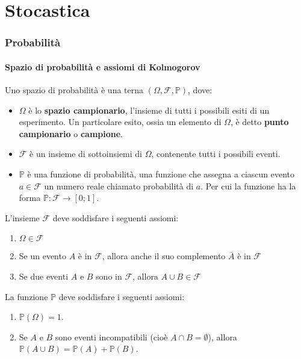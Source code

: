 \documentclass{article}
\begin{document}
\newpage
\part{Stocastica}

\section{Probabilità}

\subsection{Spazio di probabilità e assiomi di Kolmogorov}
Uno spazio di probabilità è una terna \((\Omega, \mathcal{F}, \mathbb{P})\), dove:
\begin{itemize}
    \item \(\Omega\) è lo \textbf{spazio campionario}, l'insieme di tutti i possibili esiti di
        un esperimento. Un particolare esito, ossia un elemento di \(\Omega\), è detto
        \textbf{punto campionario} o \textbf{campione}.
    \item \(\mathcal{F}\) è un insieme di sottoinsiemi di \(\Omega\), contenente tutti i
        possibili eventi.

    \item \(\mathbb{P}\) è una funzione di probabilità, una funzione che assegna a ciascun
        evento \(a \in \mathcal{F}\) un numero reale chiamato probabilità di \(a\). Per cui la
        funzione ha la forma \(\mathbb{P} \colon \mathcal{F} \to [0;1]\).
\end{itemize}
L'insieme \(\mathcal{F}\) deve soddisfare i seguenti assiomi:
\begin{enumerate}
    \item \(\Omega \in \mathcal{F}\)
    \item Se un evento \(A\) è in \(\mathcal{F}\), allora anche il suo complemento \(\overline{A}\) è in \(\mathcal{F}\)
    \item Se due eventi \(A\) e \(B\) sono in \(\mathcal{F}\), allora \(A \cup B \in \mathcal{F}\)
\end{enumerate}
La funzione \(\mathbb{P}\) deve soddisfare i seguenti assiomi:
\begin{enumerate}
    \item \(\mathbb{P}(\Omega) = 1\).
    \item Se \(A\) e \(B\) sono eventi incompatibili (cioè \(A \cap B = \emptyset\)), allora \(\mathbb{P}(A \cup B) = \mathbb{P}(A) + \mathbb{P}(B)\).
\end{enumerate}
\end{document}
